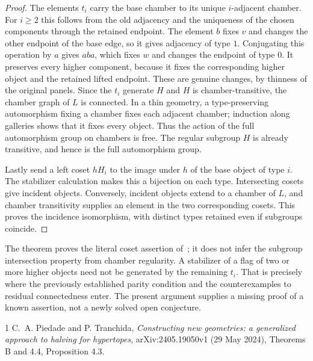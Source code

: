 \documentclass[11pt,a4paper]{article}
\begin{document}
\begin{proof}
The elements $t_i$ carry the base chamber to its unique
$i$-adjacent chamber. For $i\ge2$ this follows from the old
adjacency and the uniqueness of the chosen components through
the retained endpoint. The element $b$ fixes $v$ and changes
the other endpoint of the base edge, so it gives adjacency
of type $1$. Conjugating this operation by $a$ gives $aba$,
which fixes $w$ and changes the endpoint of type $0$.
It preserves every higher component, because it fixes the
corresponding higher object and the retained lifted endpoint.
These are genuine changes, by thinness of the original panels.
Since the $t_i$ generate $H$ and $H$ is chamber-transitive,
the chamber graph of $L$ is connected. In a thin geometry,
a type-preserving automorphism fixing a chamber fixes each
adjacent chamber; induction along galleries shows that it
fixes every object. Thus the action of the full automorphism
group on chambers is free. The regular subgroup $H$ is already
transitive, and hence is the full automorphism group.

Lastly send a left coset $hH_i$ to the image under $h$ of the
base object of type $i$. The stabilizer calculation makes
this a bijection on each type. Intersecting cosets give
incident objects. Conversely, incident objects extend to a
chamber of $L$, and chamber transitivity supplies an element
in the two corresponding cosets. This proves the incidence
isomorphism, with distinct types retained even if subgroups
coincide.
\end{proof}

The theorem proves the literal coset assertion of~\cite{PT};
it does not infer the subgroup intersection property from
chamber regularity. A stabilizer of a flag of two or more
higher objects need not be generated by the remaining $t_i$.
That is precisely where the previously established parity
condition and the counterexamples to residual connectedness
enter. The present argument supplies a missing proof of a
known assertion, not a newly solved open conjecture.

\begin{thebibliography}{1}
 C.~A. Piedade and P. Tranchida,
\emph{Constructing new geometries: a generalized approach to
halving for hypertopes}, arXiv:2405.19050v1 (29 May 2024),
Theorems B and 4.4, Proposition 4.3.
\end{thebibliography}
\end{document}

